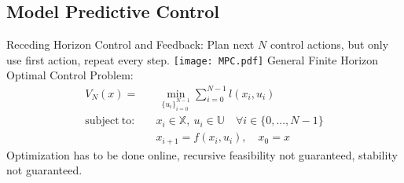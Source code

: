 \documentclass[a4paper,landscape,8pt,fleqn]{scrartcl}
\newcommand{\mb}[1]{\mathbb{#1}}
\begin{document}
\begin{multicols}{3}
\section{Model Predictive Control}
Receding Horizon Control and Feedback: Plan next $N$ control actions, but only use first action, repeat every step.
\texttt{[image: MPC.pdf]}
General Finite Horizon Optimal Control Problem:
\begin{align*}
	V_N(x) = &~\min_{\{u_i\}^{N-1}_{i=0}} \sum_{i=0}^{N-1} l(x_i,u_i)\\
	\mathrm{subject~to:} \quad& x_i \in \mb{X},~u_i \in \mb{U} \quad \forall i \in \{0,...,N-1\}\\
	& x_{i+1} = f(x_i,u_i),\quad x_0 = x
\end{align*}
Optimization has to be done online, recursive feasibility not guaranteed, stability not guaranteed.

\end{multicols}
\end{document}
